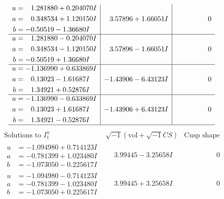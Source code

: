 \documentclass[1p]{elsarticle_modified}
\theoremstyle{definition}
\newcommand{\I}{\sqrt{-1}}
\begin{document}
$$\begin{array}{c|c|c}
\begin{aligned}
u &= \phantom{-}1.281880 + 0.204070 I \\
a &= \phantom{-}0.348534 + 1.120150 I \\
b &= -0.50519 - 1.36680 I\end{aligned}
 & \phantom{-}3.57896 + 1.66051 I & \phantom{-0.000000 } 0 \\ \hline\begin{aligned}
u &= \phantom{-}1.281880 - 0.204070 I \\
a &= \phantom{-}0.348534 - 1.120150 I \\
b &= -0.50519 + 1.36680 I\end{aligned}
 & \phantom{-}3.57896 - 1.66051 I & \phantom{-0.000000 } 0 \\ \hline\begin{aligned}
u &= -1.136990 + 0.633869 I \\
a &= \phantom{-}0.13023 - 1.61687 I \\
b &= \phantom{-}1.34921 + 0.52876 I\end{aligned}
 & -1.43906 - 6.43123 I & \phantom{-0.000000 } 0 \\ \hline\begin{aligned}
u &= -1.136990 - 0.633869 I \\
a &= \phantom{-}0.13023 + 1.61687 I \\
b &= \phantom{-}1.34921 - 0.52876 I\end{aligned}
 & -1.43906 + 6.43123 I & \phantom{-0.000000 } 0\\
 \hline 
 \end{array}$$\newpage$$\begin{array}{c|c|c}  
\text{Solutions to }I^u_{1}& \I (\text{vol} + \sqrt{-1}CS) & \text{Cusp shape}\\
 \hline 
\begin{aligned}
u &= -1.094980 + 0.714123 I \\
a &= -0.781399 + 1.023480 I \\
b &= -1.073050 - 0.225617 I\end{aligned}
 & \phantom{-}3.99445 - 3.25658 I & \phantom{-0.000000 } 0 \\ \hline\begin{aligned}
u &= -1.094980 - 0.714123 I \\
a &= -0.781399 - 1.023480 I \\
b &= -1.073050 + 0.225617 I\end{aligned}
 & \phantom{-}3.99445 + 3.25658 I & \phantom{-0.000000 } 0 \\ \hline\begin{aligned}

\end{aligned}
\end{array}$$
\end{document}
